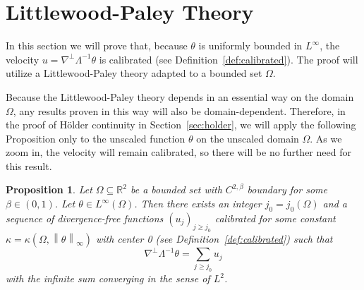 \documentclass[11pt]{amsart}
\newtheorem{proposition}[theorem]{Proposition}
\theoremstyle{remark}
\theoremstyle{definition}
\newcommand{\R}{\mathbb{R}}
\newcommand{\norm}[1]{\left\lVert#1\right\rVert}
\newcommand{\paren}[1]{\left( #1 \right)}
\newcommand{\grad}{\nabla}
\newcommand{\Ccalib}{\kappa}
\begin{document}
%
%
%


\vskip1cm
\section{Littlewood-Paley Theory} \label{sec:littlewood paley}

In this section we will prove that, because $\theta$ is uniformly bounded in $L^\infty$, the velocity $u = \grad^\perp \Lambda^{-1} \theta$ is calibrated (see Definition~\ref{def:calibrated}).  The proof will utilize a Littlewood-Paley theory adapted to a bounded set $\Omega$.  

Because the Littlewood-Paley theory depends in an essential way on the domain $\Omega$, any results proven in this way will also be domain-dependent.  Therefore, in the proof of H\"{o}lder continuity in Section~\ref{sec:holder}, we will apply the following Proposition only to the unscaled function $\theta$ on the unscaled domain $\Omega$.  As we zoom in, the velocity will remain calibrated, so there will be no further need for this result.  

\begin{proposition} \label{thm:u is calibrated}
Let $\Omega \subseteq \R^2$ be a bounded set with $C^{2,\beta}$ boundary for some $\beta \in (0,1)$.  Let $\theta \in L^\infty(\Omega)$.  Then there exists an integer $j_0 = j_0(\Omega)$ and a sequence of divergence-free functions $(u_j)_{j \geq j_0}$ calibrated for some constant $\Ccalib = \Ccalib(\Omega, \norm{\theta}_\infty)$ with center 0 (see Definition~\ref{def:calibrated}) such that
\[ \grad^\perp \Lambda^{-1} \theta = \sum_{j \geq j_0} u_j \]
with the infinite sum converging in the sense of $L^2$.  
\end{proposition}
\end{document}
